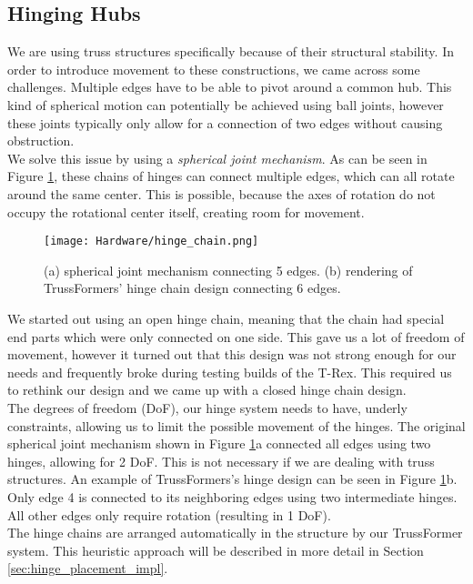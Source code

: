 \subsection{Hinging Hubs}
We are using truss structures specifically because of their structural stability. In order to introduce movement to these constructions, we came across some challenges. Multiple edges have to be able to pivot around a common hub. This kind of spherical motion can potentially be achieved using ball joints, however these joints typically only allow for a connection of two edges without causing obstruction.\\
We solve this issue by using a \textit{spherical joint mechanism}. As can be seen in Figure \ref{fig:hinge_chain}, these chains of hinges can connect multiple edges, which can all rotate around the same center. This is possible, because the axes of rotation do not occupy the rotational center itself, creating room for movement.\\
\begin{figure}[h!]
    \texttt{[image: Hardware/hinge\_chain.png]}
    \centering
    \caption{(a) spherical joint mechanism connecting 5 edges. (b) rendering of TrussFormers' hinge chain design connecting 6 edges.}
    \label{fig:hinge_chain}
\end{figure}
We started out using an open hinge chain, meaning that the chain had special end parts which were only connected on one side. This gave us a lot of freedom of movement, however it turned out that this design was not strong enough for our needs and frequently broke during testing builds of the T-Rex. This required us to rethink our design and we came up with a closed hinge chain design.\\
The degrees of freedom (DoF), our hinge system needs to have, underly constraints, allowing us to limit the possible movement of the hinges. The original spherical joint mechanism shown in Figure \ref{fig:hinge_chain}a connected all edges using two hinges, allowing for 2 DoF. This is not necessary if we are dealing with truss structures. An example of TrussFormers's hinge design can be seen in Figure \ref{fig:hinge_chain}b. Only edge 4 is connected to its neighboring edges using two intermediate hinges. All other edges only require rotation (resulting in 1 DoF).\\
The hinge chains are arranged automatically in the structure by our TrussFormer system. This heuristic approach will be described in more detail in Section \ref{sec:hinge_placement_impl}.

